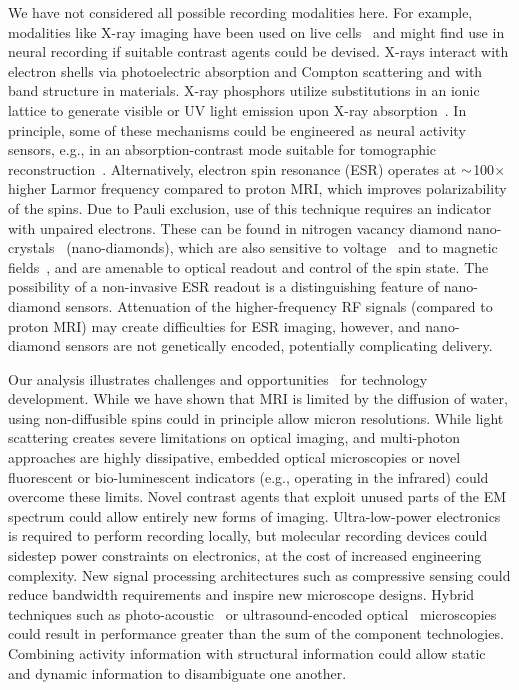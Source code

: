 We have not considered all possible recording modalities here.
For example, modalities like X-ray imaging have been used on live cells~\cite{moosmann13} and might find use in neural recording if suitable contrast agents could be devised.
X-rays interact with electron shells via photoelectric absorption and Compton scattering and with band structure in materials.
X-ray phosphors utilize substitutions in an ionic lattice to generate visible or UV light emission upon X-ray absorption~\cite{issler95}.
In principle, some of these mechanisms could be engineered as neural activity sensors, e.g., in an absorption-contrast mode suitable for tomographic reconstruction~\cite{larabell04}.
Alternatively, electron spin resonance (ESR) operates at ${\sim}$100$\times$ higher Larmor frequency compared to proton MRI, which improves polarizability of the spins.
Due to Pauli exclusion, use of this technique requires an indicator with unpaired electrons. These can be found in nitrogen vacancy diamond nano-crystals~\cite{horowitz12} (nano-diamonds), which are also sensitive to voltage~\cite{dolde11} and to magnetic fields~\cite{Hall2012}, and are amenable to optical readout and control of the spin state. The possibility of a non-invasive ESR readout is a distinguishing feature of nano-diamond sensors. Attenuation of the higher-frequency RF signals (compared to proton MRI) may create difficulties for ESR imaging, however, and nano-diamond sensors are not genetically encoded, potentially complicating delivery.

Our analysis illustrates challenges and opportunities~\cite{Dean2013} for technology development.
While we have shown that MRI is limited by the diffusion of water, using non-diffusible spins could in principle allow micron resolutions.
While light scattering creates severe limitations on optical imaging, and multi-photon approaches are highly dissipative, embedded optical microscopies or novel fluorescent or bio-luminescent indicators (e.g., operating in the infrared) could overcome these limits.
Novel contrast agents that exploit unused parts of the EM spectrum could allow entirely new forms of imaging.
Ultra-low-power electronics is required to perform recording locally, but molecular recording devices could sidestep power constraints on electronics, at the cost of increased engineering complexity.
New signal processing architectures such as compressive sensing could reduce bandwidth requirements and inspire new microscope designs.
Hybrid techniques such as photo-acoustic~\cite{filonov12} or ultrasound-encoded optical~\cite{wang12} microscopies could result in performance greater than the sum of the component technologies.
Combining activity information with structural information could allow static and dynamic information to disambiguate one another.

